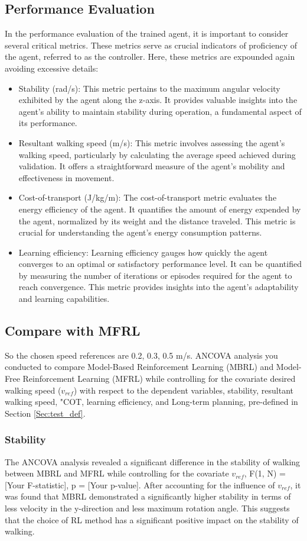 \subsection{Performance Evaluation}
In the performance evaluation of the trained agent, it is important to consider several critical metrics. These metrics serve as crucial indicators of proficiency of the agent, referred to as the controller. Here, these metrics are expounded again avoiding excessive details:
\begin{itemize}
    \item Stability (rad/s): This metric pertains to the maximum angular velocity exhibited by the agent along the z-axis. It provides valuable insights into the agent's ability to maintain stability during operation, a fundamental aspect of its performance. 
    \item Resultant walking speed (m/s): This metric involves assessing the agent's walking speed, particularly by calculating the average speed achieved during validation. It offers a straightforward measure of the agent's mobility and effectiveness in movement.
    \item Cost-of-transport (J/kg/m):  The cost-of-transport metric evaluates the energy efficiency of the agent. It quantifies the amount of energy expended by the agent, normalized by its weight and the distance traveled. This metric is crucial for understanding the agent's energy consumption patterns.
    \item Learning efficiency:  Learning efficiency gauges how quickly the agent converges to an optimal or satisfactory performance level. It can be quantified by measuring the number of iterations or episodes required for the agent to reach convergence. This metric provides insights into the agent's adaptability and learning capabilities.
\end{itemize}

\subsection{Compare with MFRL}
So the chosen speed references are 0.2, 0.3, 0.5 m/s. ANCOVA analysis you conducted to compare Model-Based Reinforcement Learning (MBRL) and Model-Free Reinforcement Learning (MFRL) while controlling for the covariate desired walking speed ($v_{ref}$) with respect to the dependent variables, stability, resultant walking speed, "\ac{COT}, learning efficiency, and Long-term planning, pre-defined in Section \ref{Sec:test_def}. 
\subsubsection*{Stability}
The ANCOVA analysis revealed a significant difference in the stability of walking between MBRL and MFRL while controlling for the covariate $v_{ref}$, F(1, N) = [Your F-statistic], p = [Your p-value]. After accounting for the influence of $v_{ref}$, it was found that MBRL demonstrated a significantly higher stability in terms of less velocity in the y-direction and less maximum rotation angle. This suggests that the choice of RL method has a significant positive impact on the stability of walking.
